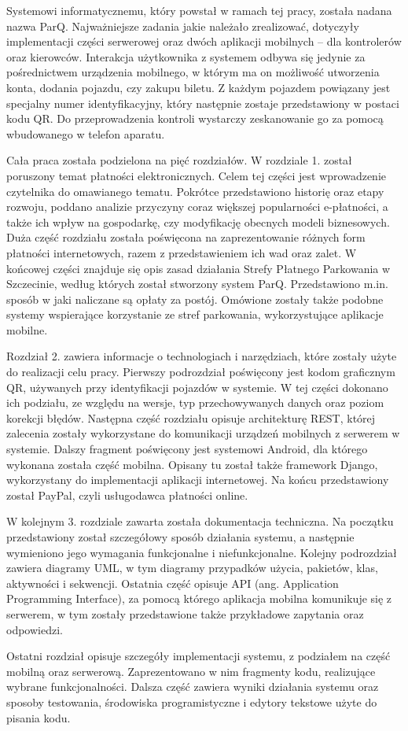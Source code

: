 Systemowi informatycznemu, który powstał w ramach tej pracy, została nadana 
nazwa ParQ. Najważniejsze zadania jakie należało zrealizować, 
dotyczyły implementacji części serwerowej oraz dwóch aplikacji mobilnych -- dla 
kontrolerów oraz kierowców. Interakcja użytkownika z systemem odbywa się 
jedynie za pośrednictwem urządzenia mobilnego, w którym ma on możliwość 
utworzenia konta, dodania pojazdu, czy zakupu biletu. Z każdym pojazdem 
powiązany jest specjalny numer identyfikacyjny, który następnie zostaje 
przedstawiony w postaci kodu QR. Do przeprowadzenia kontroli wystarczy 
zeskanowanie go za pomocą wbudowanego w telefon aparatu.

Cała praca została podzielona na pięć rozdziałów. W rozdziale 1. został 
poruszony temat płatności elektronicznych. Celem tej części jest wprowadzenie 
czytelnika do omawianego tematu. Pokrótce przedstawiono historię oraz etapy 
rozwoju, poddano analizie przyczyny coraz większej popularności e-płatności, a 
także ich wpływ na gospodarkę, czy modyfikację obecnych modeli biznesowych. 
Duża część rozdziału została poświęcona na zaprezentowanie różnych form 
płatności internetowych, razem z przedstawieniem ich wad oraz zalet. W końcowej 
części znajduje się opis zasad działania Strefy Płatnego Parkowania w 
Szczecinie, według których został stworzony system ParQ. Przedstawiono m.in. 
sposób w jaki naliczane są opłaty za postój. Omówione zostały także podobne 
systemy wspierające korzystanie ze stref parkowania, wykorzystujące aplikacje 
mobilne.

Rozdział 2. zawiera informacje o technologiach i narzędziach, które zostały 
użyte do realizacji celu pracy. Pierwszy podrozdział poświęcony jest kodom 
graficznym QR, używanych przy identyfikacji pojazdów w systemie. W tej części 
dokonano ich podziału, ze względu na wersje, typ przechowywanych danych oraz 
poziom korekcji błędów. Następna część rozdziału opisuje architekturę REST, 
której zalecenia zostały wykorzystane do komunikacji urządzeń mobilnych z 
serwerem w systemie. Dalszy fragment poświęcony jest systemowi Android, dla 
którego wykonana została część mobilna. Opisany tu został także  
framework Django, wykorzystany do implementacji aplikacji internetowej. Na końcu przedstawiony został PayPal, czyli usługodawca płatności online. 

W kolejnym 3. rozdziale zawarta została dokumentacja techniczna. Na początku przedstawiony został szczegółowy sposób działania systemu, a następnie wymieniono jego wymagania funkcjonalne i niefunkcjonalne. Kolejny podrozdział zawiera diagramy UML, w tym diagramy przypadków użycia, pakietów, klas, aktywności i sekwencji. Ostatnia część opisuje API (ang. Application Programming Interface), za pomocą którego aplikacja mobilna komunikuje się 
z serwerem, w tym zostały przedstawione także przykładowe zapytania oraz odpowiedzi.

Ostatni rozdział opisuje szczegóły implementacji systemu, z podziałem na część mobilną oraz serwerową. Zaprezentowano w nim fragmenty kodu, realizujące wybrane funkcjonalności. Dalsza część zawiera wyniki działania systemu oraz sposoby testowania, środowiska programistyczne i edytory tekstowe użyte do pisania kodu.
